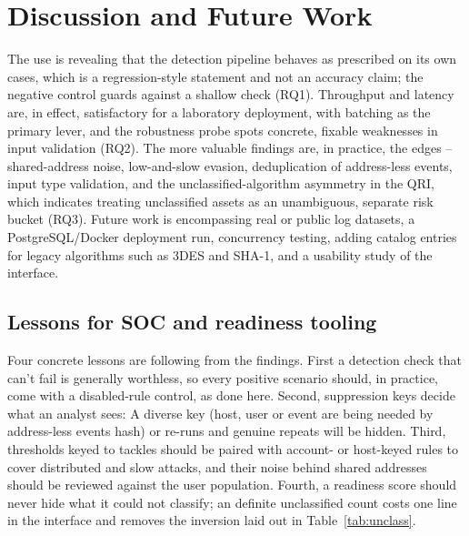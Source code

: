 \documentclass[conference]{IEEEtran}
\begin{document}
\section{Discussion and Future Work}
The use is revealing that the detection pipeline behaves as prescribed on its own cases, which is a regression-style statement and not an accuracy claim; the negative control guards against a shallow check (RQ1). Throughput and latency are, in effect, satisfactory for a laboratory deployment, with batching as the primary lever, and the robustness probe spots concrete, fixable weaknesses in input validation (RQ2). The more valuable findings are, in practice, the edges -- shared-address noise, low-and-slow evasion, deduplication of address-less events, input type validation, and the unclassified-algorithm asymmetry in the QRI, which indicates treating unclassified assets as an unambiguous, separate risk bucket (RQ3). Future work is encompassing real or public log datasets, a PostgreSQL/Docker deployment run, concurrency testing, adding catalog entries for legacy algorithms such as 3DES and SHA-1, and a usability study of the interface.

\subsection{Lessons for SOC and readiness tooling}
Four concrete lessons are following from the findings. First a detection check that can't fail is generally worthless, so every positive scenario should, in practice, come with a disabled-rule control, as done here. Second, suppression keys decide what an analyst sees: A diverse key (host, user or event are being needed by address-less events hash) or re-runs and genuine repeats will be hidden. Third, thresholds keyed to tackles should be paired with account- or host-keyed rules to cover distributed and slow attacks, and their noise behind shared addresses should be reviewed against the user population. Fourth, a readiness score should never hide what it could not classify; an definite unclassified count costs one line in the interface and removes the inversion laid out in Table~\ref{tab:unclass}.

\end{document}
